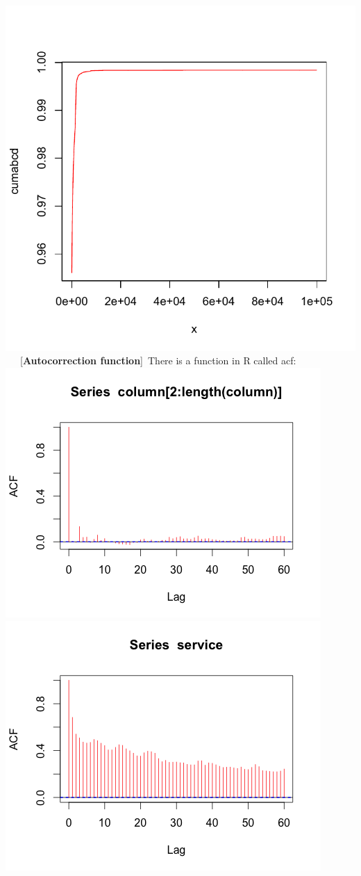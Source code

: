 \documentclass[11pt]{article}
\begin{document}
\includegraphics[scale=0.5]{trace1_2_cdf.pdf} \\
~~~[\textbf{Autocorrection function}]~There is a function in R called acf: \\
\includegraphics[scale=0.5]{acf1.png}
\includegraphics[scale=0.5]{acf2.png}
\end{document}
